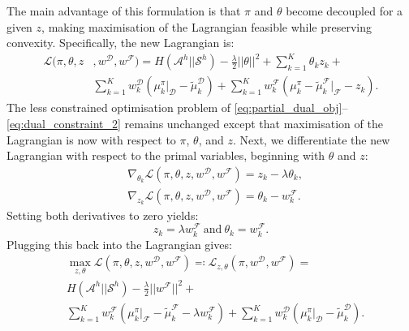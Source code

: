 \documentclass{aamas2016}
\newcommand{\sw}[1]{\textcolor{red}{SW: #1}}
\newcommand{\jm}[1]{\textcolor{blue}{Joao: #1}}
\newcommand{\ks}[1]{\textcolor{dark_green}{Kyriacos: #1}}
\newcommand{\sw}[1]{}
\newcommand{\jm}[1]{}
\newcommand{\ks}[1]{}
\begin{document}
The main advantage of this formulation is that $\pi$ and $\theta$ become decoupled for a given $z$, making maximisation of the Lagrangian feasible while preserving convexity. 
Specifically, the new Lagrangian is:
\begin{equation}
\begin{split}
\label{eq:partial_lagrangian_failure}
\mathcal{L}(\pi,\theta,z &,w^{\mathcal{D}},w^{\mathcal{F}})=  H(\mathcal{A}^h||\mathcal{S}^h) - \frac{\lambda}{2}||\theta||^2 + \sum_{k=1}^K\theta_kz_k+\\
&
\sum_{k=1}^Kw^{\mathcal{D}}_k(\mu^{\pi}_k|_{\mathcal{D}}-\widetilde{\mu}^{\mathcal{D}}_k) + 
\sum_{k=1}^Kw^{\mathcal{F}}_k (\mu^{\pi}_k -\widetilde{\mu}^{\mathcal{F}}_k|_{\mathcal{F}} - z_k).
\end{split}
\end{equation}
The less constrained optimisation problem of \eqref{eq:partial_dual_obj}--\eqref{eq:dual_constraint_2} remains unchanged except that maximisation of the Lagrangian is now with respect to $\pi$, $\theta$, and $z$.
Next, we differentiate the new Lagrangian with respect to the primal variables, beginning with $\theta$ and $z$:
\begin{align}
	&\nabla_{\theta_k}\mathcal{L}(\pi,\theta,z,w^{\mathcal{D}},w^{\mathcal{F}}) = z_k - \lambda\theta_k,\\
	&\nabla_{z_k}\mathcal{L}(\pi,\theta,z,w^{\mathcal{D}},w^{\mathcal{F}}) = \theta_k - w^{\mathcal{F}}_k.
\end{align}
Setting both derivatives to zero yields:
\begin{equation}
	z_k = \lambda w^{\mathcal{F}}_k~\mathrm{and}~\theta_k = w^{\mathcal{F}}_k.
\end{equation}
Plugging this back into the Lagrangian gives:
\begin{equation}
\begin{split}
\label{eq:partial_lagrangian_failure_simple}
&\max_{z,\theta}\mathcal{L}(\pi,\theta,z,w^{\mathcal{D}},w^{\mathcal{F}})\eqqcolon \mathcal{L}_{z,\theta}(\pi,w^{\mathcal{D}},w^{\mathcal{F}}) =\\& H(\mathcal{A}^h||\mathcal{S}^h) - \frac{\lambda}{2}||w^{\mathcal{F}}||^2 +\\ 
&\sum_{k=1}^Kw^{\mathcal{F}}_k (\mu^{\pi}_k|_{\mathcal{F}} -\widetilde{\mu}^{\mathcal{F}}_k-\lambda w^{\mathcal{F}}_k) + \sum_{k=1}^Kw^{\mathcal{D}}_k(\mu^{\pi}_k|_{\mathcal{D}}-\widetilde{\mu}^{\mathcal{D}}_k).
\end{split}
\end{equation}
\end{document}
